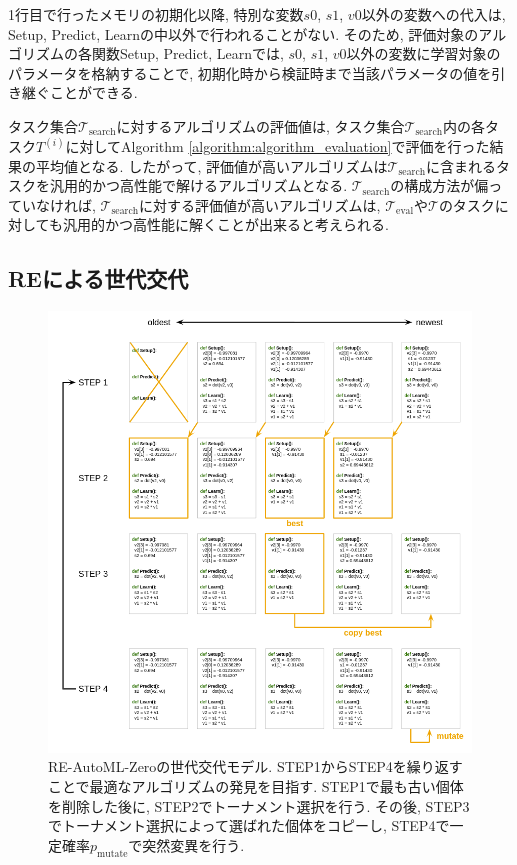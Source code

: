 \documentclass[11pt,oneside,openany,report]{jsbook}
\begin{document}
\noindent
1行目で行ったメモリの初期化以降, 特別な変数$s0$, $s1$, $v0$以外の変数への代入は, Setup, Predict, Learnの中以外で行われることがない. そのため, 評価対象のアルゴリズムの各関数Setup, Predict, Learnでは, $s0$, $s1$, $v0$以外の変数に学習対象のパラメータを格納することで, 初期化時から検証時まで当該パラメータの値を引き継ぐことができる.

タスク集合$\mathcal{T}_\mathrm{search}$に対するアルゴリズムの評価値は, タスク集合$\mathcal{T}_\mathrm{search}$内の各タスク$T^{(i)}$に対してAlgorithm \ref{algorithm:algorithm_evaluation}で評価を行った結果の平均値となる. したがって, 評価値が高いアルゴリズムは$\mathcal{T}_\mathrm{search}$に含まれるタスクを汎用的かつ高性能で解けるアルゴリズムとなる. $\mathcal{T}_\mathrm{search}$の構成方法が偏っていなければ, $\mathcal{T}_\mathrm{search}$に対する評価値が高いアルゴリズムは, $\mathcal{T}_\mathrm{eval}$や$\mathcal{T}$のタスクに対しても汎用的かつ高性能に解くことが出来ると考えられる.

\subsection{REによる世代交代}\label{subsec:problem:existing_method:re}

\begin{figure}[tbp]
  \centering
  \includegraphics[width=14cm]{regularized_evolution.png}
  \caption{RE-AutoML-Zero\cite{automl_zero}の世代交代モデル. STEP1からSTEP4を繰り返すことで最適なアルゴリズムの発見を目指す. STEP1で最も古い個体を削除した後に, STEP2でトーナメント選択を行う. その後, STEP3でトーナメント選択によって選ばれた個体をコピーし, STEP4で一定確率$p_\mathrm{mutate}$で突然変異を行う. }
  \label{fig:regularized_evolution}
\end{figure}
\end{document}
